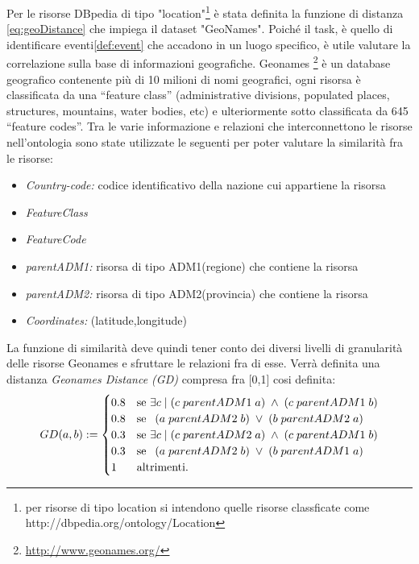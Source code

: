 \documentclass[a4paper,12pt]{report}
\begin{document}
Per le risorse DBpedia di tipo "location"\footnote{per risorse di tipo location si intendono quelle risorse classficate come http://dbpedia.org/ontology/Location} è stata definita la funzione di distanza  \ref{eq:geoDistance} che impiega il dataset "GeoNames". Poiché il task, è quello di identificare eventi\ref{def:event} che accadono in un luogo specifico, è utile valutare la correlazione sulla base di informazioni geografiche. Geonames \footnote{\href{http://www.geonames.org/}{http://www.geonames.org/}} è un database geografico contenente più di 10 milioni di nomi geografici, ogni risorsa è classificata  da una “feature class”  (administrative divisions, populated places, structures, mountains, water bodies, etc) e ulteriormente sotto classificata da 645 “feature codes”. Tra le varie informazione e relazioni che interconnettono le risorse nell'ontologia sono state utilizzate le seguenti per poter valutare la similarità fra le risorse:
\begin{itemize}
\item \emph{Country-code:} codice identificativo della nazione cui appartiene la risorsa
\item \emph{FeatureClass}
\item \emph{FeatureCode} 
\item \emph{parentADM1:} risorsa di tipo ADM1(regione) che contiene la risorsa
\item \emph{parentADM2:}  risorsa di tipo ADM2(provincia) che contiene la risorsa
\item\emph{Coordinates:} (latitude,longitude)

\end{itemize}
La funzione di similarità deve quindi tener conto dei diversi livelli di granularità delle risorse Geonames e sfruttare le relazioni fra di esse. Verrà definita una distanza \emph{Geonames Distance (GD)} compresa fra [0,1] cosi definita:
\begin{equation}
\label{eq:geonamedistance}
GD(a,b):=\begin{cases}
0.8 & \text{se $\exists c \;| \;(c\; parentADM1 \;a)\; \land \; (c\; parentADM1 \;b) $}\\
0.8 & \text{se  $ \:\:(a\; parentADM2 \;b)\; \lor \; (b\; parentADM2 \;a) $}\\
0.3 & \text{se $\exists c \;| \;(c\; parentADM2 \;a)\; \land \; (c\; parentADM1 \;b) $}\\
0.3 & \text{se  $ \:\:(a\; parentADM2 \;b)\; \lor \; (b\; parentADM1 \;a) $}\\
1& \text{altrimenti.}
\end{cases}
\end{equation}
\end{document}
